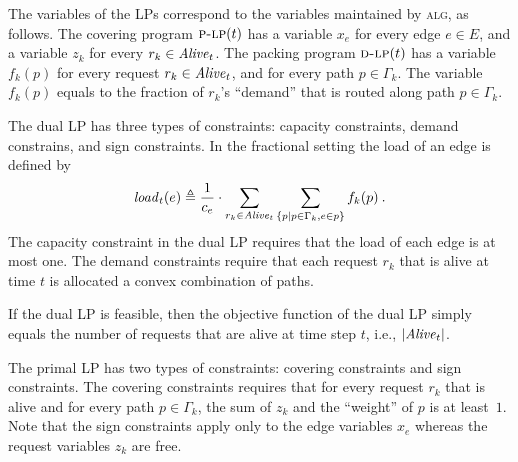 \documentclass[11pt]{article}
\newenvironment{proof sketch}[1]{\noindent {\emph{Proof sketch of #1:}}}{\hfill \qed}
\newcommand{\eqdf}{\triangleq}
\newcommand{\dlp}{\textsc{d-lp}}
\newcommand{\plp}{\textsc{p-lp}}
\newcommand{\alg}{\textsc{alg}}
\newcommand{\load}{\text{\textit{load}}}
\newcommand{\alive}{\text{\textit{Alive}}}
\begin{document}
The variables of the LPs correspond to the variables maintained by
\alg, as follows.  The covering program $\plp(t)$ has a variable $x_e$
for every edge $e \in E$, and a variable $z_k$ for every $r_k \in
\alive_t$.  The packing program $\dlp(t)$ has a variable $f_k(p)$ for
every request $r_k \in \alive_t$, and for every path $p \in \Gamma_k$.  The
variable $f_k(p)$ equals to the fraction of $r_k$'s ``demand'' that is
routed along path $p \in \Gamma_k$.

The dual LP has three types of constraints: capacity constraints,
demand constrains, and sign constraints.  In the fractional setting
the load of an edge is defined by
\[
\load_t(e) \eqdf \frac{1}{c_e} \cdot
\sum_{r_k \in \alive_t} \sum_{\{p \mid p\in \Gamma_k, e \in p\}}f_k(p)
\:.
\]
The capacity constraint in the dual LP requires that the load of each
edge is at most one.  The demand constraints require that each request
$r_k$ that is alive at time $t$ is allocated a convex combination of
paths.

If the dual LP is feasible, then the
objective function of the dual LP simply equals the number of requests
that are alive at time step $t$, i.e., $|\alive_t|$.

The primal LP has two types of constraints: covering constraints and
sign constraints.  The covering constraints requires that for every
request $r_k$ that is alive and for every path $p \in \Gamma_k$, the sum of
$z_k$ and the ``weight'' of $p$ is at least~$1$.  Note that the sign
constraints apply only to the edge variables $x_e$ whereas the request
variables $z_k$ are free.
\end{document}
